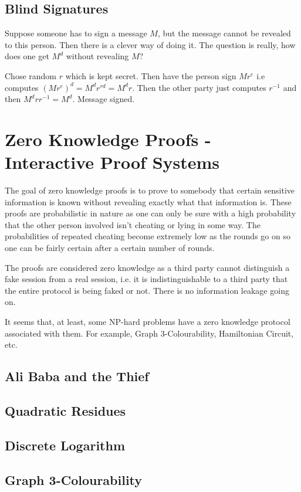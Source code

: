 \documentclass[12pt,a4paper]{article}
\begin{document}
\subsection{Blind Signatures}
Suppose someone has to sign a message $M$, but the message cannot be revealed to this person. Then there is a clever way of doing it. The question is really, how does one get $M^{d}$ without revealing $M$? 

Chose random $r$ which is kept secret. Then have the person sign $Mr^{e}$ i.e computes $(Mr^{e})^{d} = M^{d}r^{rd} = M^{d}r$. Then the other party just computes $r^{-1}$ and then $M^{d}rr^{-1} = M^{d}$. Message signed. 


\section{Zero Knowledge Proofs - Interactive Proof Systems}
The goal of zero knowledge proofs is to prove to somebody that certain sensitive information is known without revealing exactly what that information is. These proofs are probabilistic in nature as one can only be sure with a high probability that the other person involved isn't cheating or lying in some way. The probabilities of repeated cheating become extremely low as the rounds go on so one can be fairly certain after a certain number of rounds. 

The proofs are considered zero knowledge as a third party cannot distinguish a fake session from a real session, i.e. it is indistinguishable to a third party that the entire protocol is being faked or not. There is no information leakage going on. 

It seems that, at least, some NP-hard problems have a zero knowledge protocol associated with them. For example, Graph 3-Colourability, Hamiltonian Circuit, etc. 

\subsection{Ali Baba and the Thief}
\subsection{Quadratic Residues}
\subsection{Discrete Logarithm}
\subsection{Graph 3-Colourability}
\end{document}
